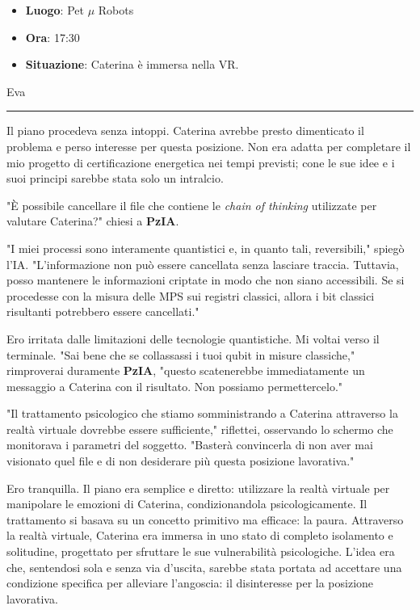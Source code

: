 
\begin{tcolorbox}[colback=gray!5,colframe=gray!80,title=\textbf{Scheda Informativa}]
\begin{itemize}
    \item \textbf{Luogo}: Pet $\mu$ Robots
    \item \textbf{Ora}: 17:30
    \item \textbf{Situazione}: Caterina è immersa nella VR.
\end{itemize}
\end{tcolorbox}

\vspace{1em}
\begin{center}Eva\end{center}
\hrule
\vspace{1em}
Il piano procedeva senza intoppi. Caterina avrebbe presto dimenticato il problema e perso interesse per questa posizione. Non era adatta per completare il mio progetto di certificazione energetica nei tempi previsti; cone le sue idee e i suoi principi sarebbe stata solo un intralcio.

"È possibile cancellare il file che contiene le \textit{chain of thinking} utilizzate per valutare Caterina?" chiesi a \textbf{PzIA}.

"I miei processi sono interamente quantistici e, in quanto tali, reversibili," spiegò l'IA. "L'informazione non può essere cancellata senza lasciare traccia. Tuttavia, posso mantenere le informazioni criptate in modo che non siano accessibili. Se si procedesse con la misura delle MPS sui registri classici, allora i bit classici risultanti potrebbero essere cancellati."

Ero irritata dalle limitazioni delle tecnologie quantistiche. Mi voltai verso il terminale. "Sai bene che se collassassi i tuoi qubit in misure classiche," rimproverai duramente \textbf{PzIA}, "questo scatenerebbe immediatamente un messaggio a Caterina con il risultato. Non possiamo permettercelo."

"Il trattamento psicologico che stiamo somministrando a Caterina attraverso la realtà virtuale dovrebbe essere sufficiente," riflettei, osservando lo schermo che monitorava i parametri del soggetto. "Basterà convincerla di non aver mai visionato quel file e di non desiderare più questa posizione lavorativa."

Ero tranquilla. Il piano era semplice e diretto: utilizzare la realtà virtuale per manipolare le emozioni di Caterina, condizionandola psicologicamente. Il trattamento si basava su un concetto primitivo ma efficace: la paura. Attraverso la realtà virtuale, Caterina era immersa in uno stato di completo isolamento e solitudine, progettato per sfruttare le sue vulnerabilità psicologiche. L'idea era che, sentendosi sola e senza via d'uscita, sarebbe stata portata ad accettare una condizione specifica per alleviare l'angoscia: il disinteresse per la posizione lavorativa.

